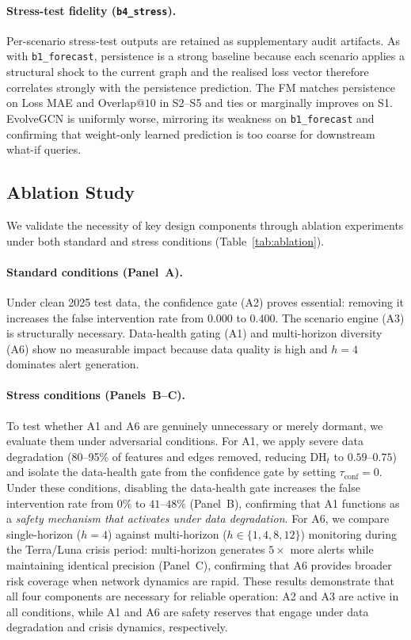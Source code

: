\paragraph{Stress-test fidelity (\texttt{b4\_stress}).} Per-scenario stress-test outputs are retained as supplementary audit artifacts. As with \texttt{b1\_forecast}, persistence is a strong baseline because each scenario applies a structural shock to the current graph and the realised loss vector therefore correlates strongly with the persistence prediction. The FM matches persistence on Loss MAE and Overlap@$10$ in S2--S5 and ties or marginally improves on S1. EvolveGCN is uniformly worse, mirroring its weakness on \texttt{b1\_forecast} and confirming that weight-only learned prediction is too coarse for downstream what-if queries.

\subsection{Ablation Study}

We validate the necessity of key design components through ablation experiments under both standard and stress conditions (Table~\ref{tab:ablation}).



\paragraph{Standard conditions (Panel~A).} Under clean 2025 test data, the confidence gate (A2) proves essential: removing it increases the false intervention rate from $0.000$ to $0.400$. The scenario engine (A3) is structurally necessary. Data-health gating (A1) and multi-horizon diversity (A6) show no measurable impact because data quality is high and $h=4$ dominates alert generation.

\paragraph{Stress conditions (Panels~B--C).} To test whether A1 and A6 are genuinely unnecessary or merely dormant, we evaluate them under adversarial conditions. For A1, we apply severe data degradation (80--95\% of features and edges removed, reducing $\mathrm{DH}_t$ to $0.59$--$0.75$) and isolate the data-health gate from the confidence gate by setting $\tau_{\mathrm{conf}}=0$. Under these conditions, disabling the data-health gate increases the false intervention rate from $0\%$ to $41$--$48\%$ (Panel~B), confirming that A1 functions as a \emph{safety mechanism that activates under data degradation}. For A6, we compare single-horizon ($h=4$) against multi-horizon ($h\in\{1,4,8,12\}$) monitoring during the Terra/Luna crisis period: multi-horizon generates $5\times$ more alerts while maintaining identical precision (Panel~C), confirming that A6 provides broader risk coverage when network dynamics are rapid. These results demonstrate that all four components are necessary for reliable operation: A2 and A3 are active in all conditions, while A1 and A6 are safety reserves that engage under data degradation and crisis dynamics, respectively.
